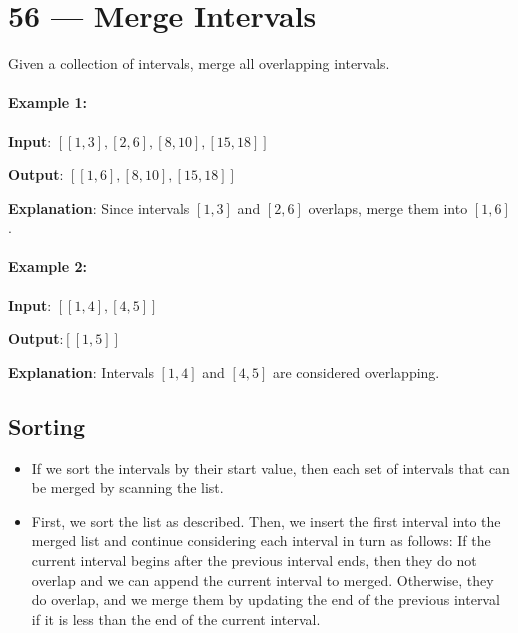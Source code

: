 \section{56 --- Merge Intervals}
Given a collection of intervals, merge all overlapping intervals.

\paragraph{Example 1:}

\begin{flushleft}
\textbf{Input}: $[[1,3],[2,6],[8,10],[15,18]]$

\textbf{Output}: $[[1,6],[8,10],[15,18]]$

\textbf{Explanation}: Since intervals $ [1,3] $ and $ [2,6] $ overlaps, merge them into $ [1,6] $.
\end{flushleft}

\paragraph{Example 2:}

\begin{flushleft}
\textbf{Input}: $ [[1,4],[4,5]] $

\textbf{Output}:$  [[1,5]] $

\textbf{Explanation}: Intervals $ [1,4] $ and $ [4,5] $ are considered overlapping.
\end{flushleft}

\subsection{Sorting}
\begin{itemize}
\item If we sort the intervals by their start value, then each set of intervals that can be merged by scanning the list.
\item First, we sort the list as described. Then, we insert the first interval into the merged list and continue considering each interval in turn as follows: If the current interval begins after the previous interval ends, then they do not overlap and we can append the current interval to merged. Otherwise, they do overlap, and we merge them by updating the end of the previous interval if it is less than the end of the current interval.
\end{itemize}

